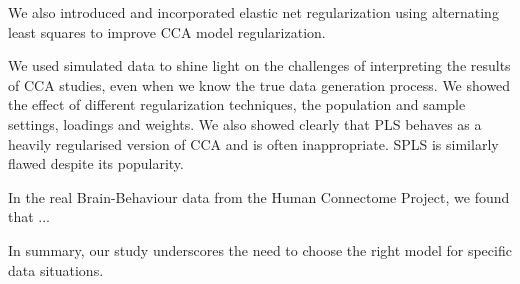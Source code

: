 We also introduced and incorporated elastic net regularization using alternating least squares to improve CCA model regularization.

We used simulated data to shine light on the challenges of interpreting the results of CCA studies, even when we know the true data generation process.
We showed the effect of different regularization techniques, the population and sample settings, loadings and weights.
We also showed clearly that PLS behaves as a heavily regularised version of CCA and is often inappropriate.
SPLS is similarly flawed despite its popularity.

In the real Brain-Behaviour data from the Human Connectome Project, we found that ...

In summary, our study underscores the need to choose the right model for specific data situations.



